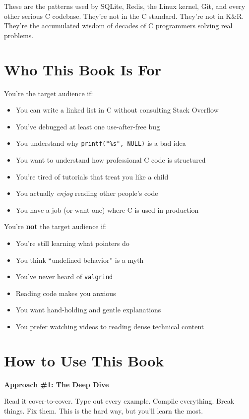\documentclass[11pt,openany]{book}
\begin{document}
These are the patterns used by SQLite, Redis, the Linux kernel, Git, and every other serious C codebase. They're not in the C standard. They're not in K\&R. They're the accumulated wisdom of decades of C programmers solving real problems.

\section*{Who This Book Is For}

You're the target audience if:
\begin{itemize}
    \item You can write a linked list in C without consulting Stack Overflow
    \item You've debugged at least one use-after-free bug
    \item You understand why \texttt{printf("\%s", NULL)} is a bad idea
    \item You want to understand how professional C code is structured
    \item You're tired of tutorials that treat you like a child
    \item You actually \textit{enjoy} reading other people's code
    \item You have a job (or want one) where C is used in production
\end{itemize}

You're \textbf{not} the target audience if:
\begin{itemize}
    \item You're still learning what pointers do
    \item You think ``undefined behavior'' is a myth
    \item You've never heard of \texttt{valgrind}
    \item Reading code makes you anxious
    \item You want hand-holding and gentle explanations
    \item You prefer watching videos to reading dense technical content
\end{itemize}

\section*{How to Use This Book}

\textbf{Approach \#1: The Deep Dive}

Read it cover-to-cover. Type out every example. Compile everything. Break things. Fix them. This is the hard way, but you'll learn the most.
\end{document}
